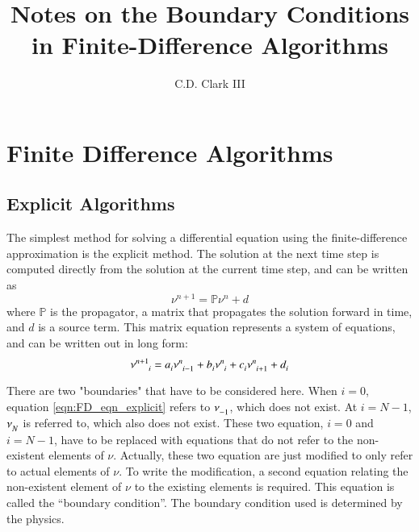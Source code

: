 \documentclass[letterpaper,12pt]{article}
\title{Notes on the Boundary Conditions in Finite-Difference Algorithms}
\author{C.D. Clark III}
\begin{document}
\maketitle


\section{Finite Difference Algorithms}

\subsection{Explicit Algorithms}

The simplest method for solving a differential equation using the finite-difference approximation is the explicit method.
The solution at the next time step is computed directly from the solution at the current time step, and can be written as
\begin{equation}
   \nu^{n+1} = \mathbb{P} \nu^n + d
\end{equation}
where $\mathbb{P}$ is the propagator, a matrix that propagates the solution forward in time, and $d$ is a source term. This matrix equation represents a system of equations,
and can be written out in long form:
\begin{equation}
  \label{eqn:FD_eqn_explicit}
\nu\indices{^{n+1}_{i  }}
=
  a\indices{_i} \nu\indices{^{n  }_{i-1}}
+ b\indices{_i} \nu\indices{^{n  }_{i  }}
+ c\indices{_i} \nu\indices{^{n  }_{i+1}}
+ d\indices{_i}
\end{equation}

There are two "boundaries" that have to be considered here. When $i = 0$,
equation \ref{eqn:FD_eqn_explicit} refers to $\nu\indices{_{-1}}$, which does not exist. At $i =
N-1$, $\nu\indices{_N}$ is referred to, which also does not exist. These two
equation, $i = 0$ and $i = N-1$, have to be replaced with equations that do not
refer to the non-existent elements of $\nu$. Actually, these two equation are
just modified to only refer to actual elements of $\nu$.  To write the
modification, a second equation relating the non-existent element of $\nu$ to
the existing elements is required. This equation is called the ``boundary
condition''. The boundary condition used is determined by the physics.
\end{document}
